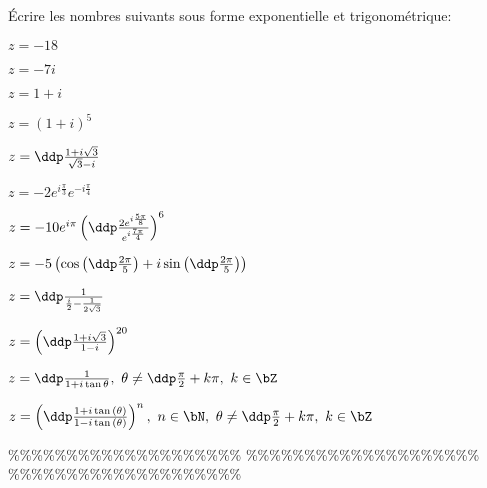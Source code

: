 



\begin{exercice}  \;
\'Ecrire les nombres suivants sous forme exponentielle et trigonom\'etrique:
\begin{enumerate}
\begin{minipage}[t]{0.45\textwidth}
\item $z=-18$
\item $z=-7i$
\item $z=1+i$
\item $z=(1+i)^5$ 
\item $z=\ddp\frac{1+i\sqrt{3}}{\sqrt{3}-i}$ 
\item $z=-2e^{i\frac{\pi}{3}}e^{-i\frac{\pi}{4}}$
\item $z=-10e^{i\pi}\left(\ddp\frac{2e^{i\frac{5\pi}{8}}}{e^{i\frac{7\pi}{4}}}\right)^6$
\end{minipage}
\begin{minipage}[t]{0.45\textwidth}
\item $z=-5\left(\cos{\left(\ddp\frac{2\pi}{5}\right)} +i\sin{\left(\ddp\frac{2\pi}{5}\right)}  \right)$
\item $z=\ddp\frac{1}{\frac{i}{2}-\frac{1}{2\sqrt{3}}}$
\item $z=\left( \ddp\frac{1+i\sqrt{3}}{1-i}  \right)^{20}$
\item $z=\ddp\frac{1}{1+i\tan{\theta}},\ \theta\not= \ddp\frac{\pi}{2}+k\pi,\ k\in\bZ$
\item $z=\left( \ddp\frac{1+i\tan{(\theta)}}{1-i\tan{(\theta)}}  \right)^n,\ n\in\bN,\ \theta\not= \ddp\frac{\pi}{2}+k\pi,\ k\in\bZ$
\end{minipage}
\end{enumerate}
\end{exercice}


\%\%\%\%\%\%\%\%\%\%\%\%\%\%\%\%\%\%\%\%
\%\%\%\%\%\%\%\%\%\%\%\%\%\%\%\%\%\%\%\%
\%\%\%\%\%\%\%\%\%\%\%\%\%\%\%\%\%\%\%\%




